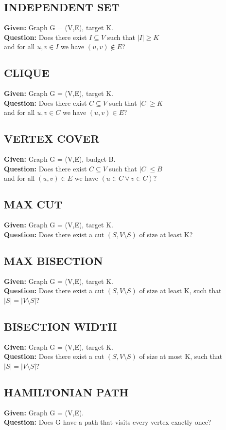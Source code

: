 \subsection{INDEPENDENT SET}
\textbf{Given:} Graph G = (V,E), target K. \\
\textbf{Question:} Does there exist $I \subseteq V$ such that $|I| \geq K$\\ and for all $u,v\in I$ we have $(u,v) \notin E$? 
\subsection{CLIQUE}
\textbf{Given:} Graph G = (V,E), target K. \\
\textbf{Question:} Does there exist $C \subseteq V$ such that $|C| \geq K$\\ and for all $u,v\in C$ we have $(u,v) \in E$?
\subsection{VERTEX COVER}
\textbf{Given:} Graph G = (V,E), budget B. \\
\textbf{Question:} Does there exist $C \subseteq V$ such that $|C| \leq B$\\
and for all $(u,v) \in E$ we have $(u \in C \lor v \in C)$?
\subsection{MAX CUT}
\textbf{Given:} Graph G = (V,E), target K. \\
\textbf{Question:} Does there exist a cut  $(S,V\setminus S)$ of size at least K?\\
\subsection{MAX BISECTION}
\textbf{Given:} Graph G = (V,E), target K.\\
\textbf{Question:} Does there exist a cut  $(S,V\setminus S)$ of size at least K, such that $|S| =  |V \setminus S|$?
\subsection{BISECTION WIDTH}
\textbf{Given:} Graph G = (V,E), target K.\\
\textbf{Question:} Does there exist a cut  $(S,V\setminus S)$ of size at most K, such that $|S| =  |V \setminus S|$?
\subsection{HAMILTONIAN PATH}
\textbf{Given:} Graph G = (V,E).\\
\textbf{Question:} Does G have a path that visits every vertex exactly once?\\
